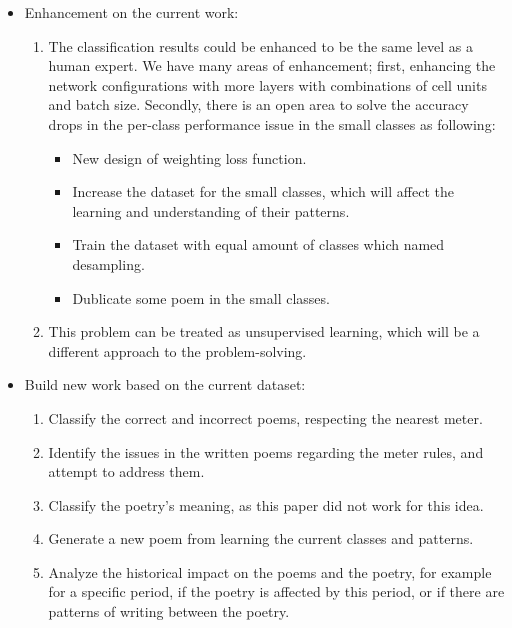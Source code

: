 \begin{itemize}
  \item Enhancement on the current work:
  \begin{enumerate}
    \item The classification results could be enhanced to be the same level as a human expert. We have many areas of enhancement; first, enhancing the network configurations with more layers with combinations of cell units and batch size. Secondly, there is an open area to solve the accuracy drops in the per-class performance issue in the small classes as following: 
    {\color{red}
    	\begin{itemize}
    		\item New design of weighting loss function. 
    		\item Increase the dataset for the small classes, which will affect the learning and understanding of their patterns. 
    		\item Train the dataset with equal amount of classes which named desampling. 
    		\item Dublicate some poem in the small classes.
    	\end{itemize}
}
    \item This problem can be treated as unsupervised learning, which will be a different approach to the problem-solving.
  \end{enumerate}
  \item Build new work based on the current dataset:
    \begin{enumerate}
    \item Classify the correct and incorrect poems, respecting the nearest meter.
    \item Identify the issues in the written poems regarding the meter rules, and attempt to address them.
    \item Classify the poetry’s meaning, as this paper did not work for this idea.
    \item Generate a new poem from learning the current classes and patterns.
    \item Analyze the historical impact on the poems and the poetry, for example for a specific period, if the poetry is affected by this period, or if there are patterns of writing between the poetry.
  \end{enumerate}
  
\end{itemize}


